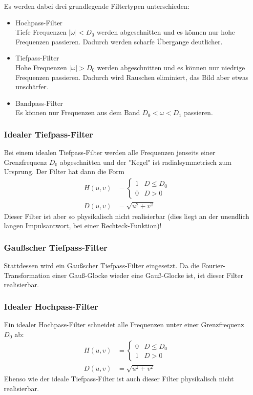 			Es werden dabei drei grundlegende Filtertypen unterschieden:
			\begin{itemize}
				\item Hochpass-Filter \\ Tiefe Frequenzen \( \lvert \omega \rvert < D_0 \) werden abgeschnitten und es können nur hohe Frequenzen passieren. Dadurch werden scharfe Übergange deutlicher.
				\item Tiefpass-Filter \\ Hohe Frequenzen \( \lvert \omega \rvert > D_0 \) werden abgeschnitten und es können nur niedrige Frequenzen passieren. Dadurch wird Rauschen eliminiert, das Bild aber etwas unschärfer.
				\item Bandpass-Filter \\ Es können nur Frequenzen aus dem Band \( D_0 < \omega < D_1 \) passieren.
			\end{itemize}

			\subsubsection{Idealer Tiefpass-Filter}
				Bei einem idealen Tiefpass-Filter werden alle Frequenzen jenseits einer Grenzfrequenz \( D_0 \) abgeschnitten und der "Kegel" ist radialsymmetrisch zum Ursprung. Der Filter hat dann die Form
				\begin{align*}
					H(u, v) &=
						\begin{cases}
							1 & D \leq D_0 \\
							0 & D > 0
						\end{cases} \\
					D(u, v) &= \sqrt{u^2 + v^2}
				\end{align*}
				Dieser Filter ist aber so physikalisch nicht realisierbar (dies liegt an der unendlich langen Impulsantwort, \zB bei einer Rechteck-Funktion)!

			\subsubsection{Gaußscher Tiefpass-Filter}
				Stattdessen wird ein Gaußscher Tiefpass-Filter eingesetzt. Da die Fourier-Transformation einer Gauß-Glocke wieder eine Gauß-Glocke ist, ist dieser Filter realisierbar.

			\subsubsection{Idealer Hochpass-Filter}
				Ein idealer Hochpass-Filter schneidet alle Frequenzen unter einer Grenzfrequenz \( D_0 \) ab:
				\begin{align*}
					H(u, v) &=
						\begin{cases}
							0 & D \leq D_0 \\
							1 & D > 0
						\end{cases} \\
					D(u, v) &= \sqrt{u^2 + v^2}
				\end{align*}
				Ebenso wie der ideale Tiefpass-Filter ist auch dieser Filter physikalisch nicht realisierbar.

